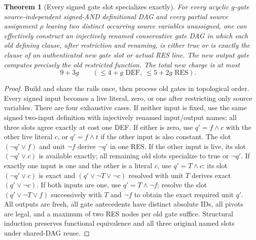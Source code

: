 \documentclass[11pt]{article}
\newtheorem{theorem}{Theorem}
\begin{document}
\begin{theorem}[Every signed gate slot specializes exactly]
For every acyclic $g$-gate source-independent signed-AND definitional DAG and every partial source assignment $\rho$ leaving two distinct occurring source variables unassigned, one can effectively construct an injectively renamed conservative gate DAG in which \emph{each old defining clause}, after restriction and renaming, is either true or is exactly the clause of an authenticated new gate slot or actual RES line. The new output gate computes precisely the old restricted function. The total new charge is at most
\[
\boxed{9+3g} \qquad(\le4+g\text{ DEF},\ \le5+2g\text{ RES}).
\]
\end{theorem}
\begin{proof}
Build and share the rails once, then process old gates in topological order. Every signed input becomes a live literal, zero, or one after restricting only source variables. There are four exhaustive cases. If neither input is fixed, use the same signed two-input definition with injectively renamed input/output names; all three slots agree exactly at cost one DEF. If either is zero, use $q'=f\wedge c$ with the other live literal $c$, or $q'=f\wedge t$ if the other input is also constant. The slot $(\neg q'\vee f)$ and unit $\neg f$ derive $\neg q'$ in one RES. If the other input is live, its slot $(\neg q'\vee c)$ is available exactly; all remaining old slots specialize to true or $\neg q'$. If exactly one input is one and the other is a literal $c$, use $q'=T\wedge c$: its slot $(\neg q'\vee c)$ is exact and $(q'\vee\neg T\vee\neg c)$ resolved with unit $T$ derives exact $(q'\vee\neg c)$. If both inputs are one, use $q'=T\wedge\neg f$; resolve the slot $(q'\vee\neg T\vee f)$ successively with $T$ and $\neg f$ to obtain the exact required unit $q'$. All outputs are fresh, all gate antecedents have distinct absolute IDs, all pivots are legal, and a maximum of two RES nodes per old gate suffice. Structural induction preserves functional equivalence and all three original named slots under shared-DAG reuse.
\end{proof}
\end{document}

